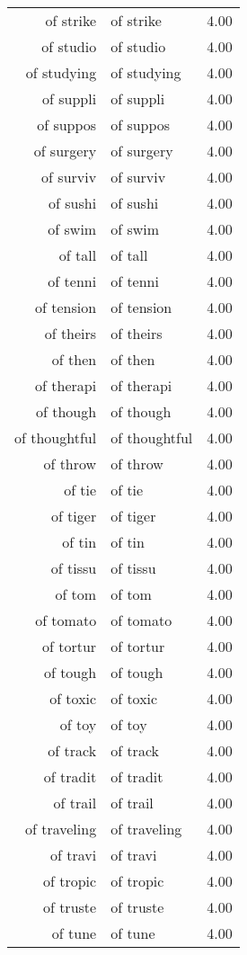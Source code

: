 \begin{table}[ht]
\begin{tabular}{rlr}
  of strike & of strike & 4.00 \\ 
  of studio & of studio & 4.00 \\ 
  of studying & of studying & 4.00 \\ 
  of suppli & of suppli & 4.00 \\ 
  of suppos & of suppos & 4.00 \\ 
  of surgery & of surgery & 4.00 \\ 
  of surviv & of surviv & 4.00 \\ 
  of sushi & of sushi & 4.00 \\ 
  of swim & of swim & 4.00 \\ 
  of tall & of tall & 4.00 \\ 
  of tenni & of tenni & 4.00 \\ 
  of tension & of tension & 4.00 \\ 
  of theirs & of theirs & 4.00 \\ 
  of then & of then & 4.00 \\ 
  of therapi & of therapi & 4.00 \\ 
  of though & of though & 4.00 \\ 
  of thoughtful & of thoughtful & 4.00 \\ 
  of throw & of throw & 4.00 \\ 
  of tie & of tie & 4.00 \\ 
  of tiger & of tiger & 4.00 \\ 
  of tin & of tin & 4.00 \\ 
  of tissu & of tissu & 4.00 \\ 
  of tom & of tom & 4.00 \\ 
  of tomato & of tomato & 4.00 \\ 
  of tortur & of tortur & 4.00 \\ 
  of tough & of tough & 4.00 \\ 
  of toxic & of toxic & 4.00 \\ 
  of toy & of toy & 4.00 \\ 
  of track & of track & 4.00 \\ 
  of tradit & of tradit & 4.00 \\ 
  of trail & of trail & 4.00 \\ 
  of traveling & of traveling & 4.00 \\ 
  of travi & of travi & 4.00 \\ 
  of tropic & of tropic & 4.00 \\ 
  of truste & of truste & 4.00 \\ 
  of tune & of tune & 4.00 \\ 

\end{tabular}
\end{table}
